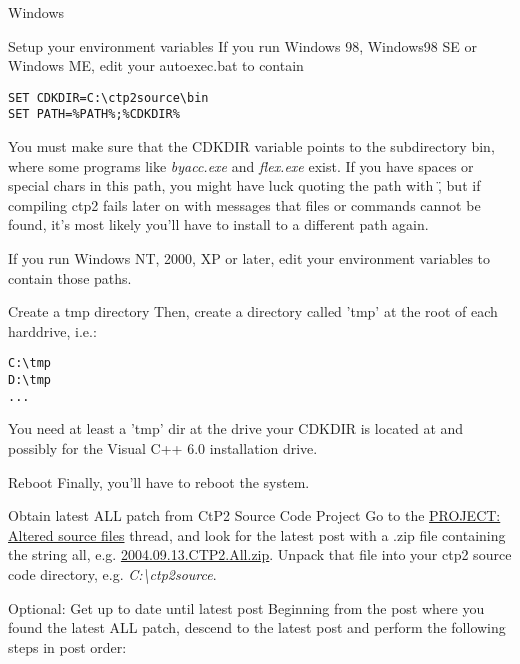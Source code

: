 \begin{section}{Windows}
\begin{subsection}{Setup your environment variables}
If you run Windows 98, Windows98 SE or Windows ME, edit your autoexec.bat to contain
\begin{verbatim}
SET CDKDIR=C:\ctp2source\bin
SET PATH=%PATH%;%CDKDIR%
\end{verbatim}
You must make sure that the CDKDIR variable points to the subdirectory bin, where some programs like \textit{byacc.exe} and \textit{flex.exe} exist. If you have spaces or special chars in this path, you might have luck quoting the path with \", but if compiling ctp2 fails later on with messages that files or commands cannot be found, it's most likely you'll have to install to a different path again.

If you run Windows NT, 2000, XP or later, edit your environment variables to contain those paths.
\end{subsection}%

\begin{subsection}{Create a tmp directory}
Then, create a directory called 'tmp' at the root of each harddrive, i.e.:
\begin{verbatim}
C:\tmp
D:\tmp
...
\end{verbatim}
You need at least a 'tmp' dir at the drive your CDKDIR is located at and possibly for the Visual C++ 6.0 installation drive.
\end{subsection}%

\begin{subsection}{Reboot}
Finally, you'll have to reboot the system.
\end{subsection}%

\begin{subsection}{Obtain latest ALL patch from CtP2 Source Code Project}
Go to the \href{http://apolyton.net/forums/showthread.php?threadid=100609&goto=lastpost}{PROJECT: Altered source files} thread, and look for the latest post with a .zip file containing the string all, e.g. \href{http://apolyton.net/csd.php?http://apolyton.net/go.php?http://page.mi.fu-berlin.de/~guehmann/CTP2/2004.09.13.CTP2.All.zip}{2004.09.13.CTP2.All.zip}. Unpack that file into your ctp2 source code directory, e.g. \textit{C:\textbackslash{}ctp2source}.
\end{subsection}%

\begin{subsection}{Optional: Get up to date until latest post}
Beginning from the post where you found the latest ALL patch, descend to the latest post and perform the following steps in post order:


\end{subsection}
\end{section}
